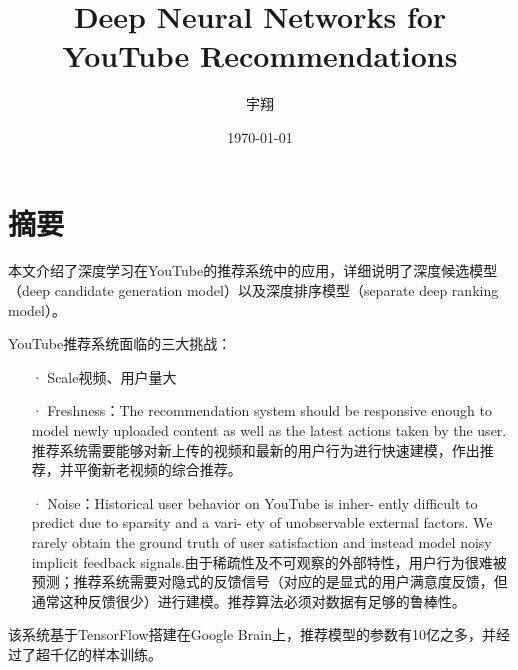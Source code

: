 \documentclass[UTF8]{ctexart}
\title{\heiti Deep Neural Networks for YouTube Recommendations }
\author{\kaishu 宇翔}
\date{\today}
\begin{document}
    \section{摘要}\label{sec:diyijie}
    本文介绍了深度学习在YouTube的推荐系统中的应用，详细说明了深度候选模型（deep candidate generation model）以及深度排序模型（separate deep ranking model）。

    YouTube推荐系统面临的三大挑战：
	\begin{itemize}
		\item[·] Scale视频、用户量大
		\item[·] Freshness：The recommendation system should be responsive enough to model newly uploaded content as well as the latest actions taken by the user. 推荐系统需要能够对新上传的视频和最新的用户行为进行快速建模，作出推荐，并平衡新老视频的综合推荐。
		\item[·] Noise：Historical user behavior on YouTube is inher- ently difficult to predict due to sparsity and a vari- ety of unobservable external factors. We rarely obtain the ground truth of user satisfaction and instead model noisy implicit feedback signals.由于稀疏性及不可观察的外部特性，用户行为很难被预测；推荐系统需要对隐式的反馈信号（对应的是显式的用户满意度反馈，但通常这种反馈很少）进行建模。推荐算法必须对数据有足够的鲁棒性。
	\end{itemize}
	
	该系统基于TensorFlow搭建在Google Brain上，推荐模型的参数有10亿之多，并经过了超千亿的样本训练。
    \clearpage
\end{document}
